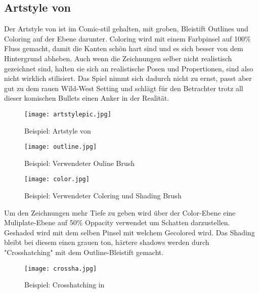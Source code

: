 \subsection{Artstyle von \FF}\label{subsec:artsytle}

Der Artstyle von \FF ist im Comic-stil gehalten, mit groben, Bleistift Outlines und Coloring auf der Ebene darunter.
Coloring wird mit einem Farbpinsel auf 100\% Fluss gemacht, damit die Kanten schön hart sind und es sich besser von dem Hintergrund abheben.
Auch wenn die Zeichnungen selber nicht realistisch gezeichnet sind, halten sie sich an realistische Posen und Propertionen, sind also nicht wirklich stilisiert.
Das Spiel nimmt sich dadurch nicht zu ernst, passt aber gut zu dem rauen Wild-West Setting und schlägt für den Betrachter trotz all dieser komischen Bullets
einen Anker in der Realität.

\begin{figure}[H]
    \centering
    \texttt{[image: artstylepic.jpg]}
    \caption{Beispiel: Artstyle von \FF}
\end{figure}

\begin{figure}[H]
    \centering
    \texttt{[image: outline.jpg]}
    \caption{Beispiel: Verwendeter Ouline Brush}
\end{figure}

\begin{figure}[H]
    \centering
    \texttt{[image: color.jpg]}
    \caption{Beispiel: Verwendeter Colering und Shading Brush}
\end{figure}


Um den Zeichnungen mehr Tiefe zu geben wird über der Color-Ebene eine Muliplate-Ebene auf 50\% Oppacity verwendet um Schatten
darzustellen. Geshaded wird mit dem selben Pinsel mit welchem Gecolored wird. Das Shading bleibt bei diesem einen grauen ton,
härtere shadows werden durch "Crosshatching" mit dem Outline-Bleistift gemacht.

\begin{figure}[H]
    \centering
    \texttt{[image: crossha.jpg]}
    \caption{Beispiel: Crosshatching in \FF}
\end{figure}

\renewcommand{\kapitelautor}{}

